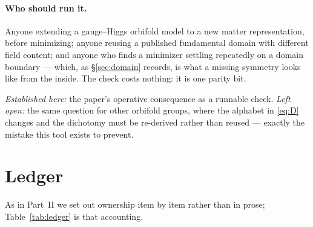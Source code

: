 \documentclass[11pt,a4paper]{article}
\begin{document}
\paragraph{Who should run it.} Anyone extending a gauge--Higgs orbifold model to a new
matter representation, before minimizing; anyone reusing a published fundamental domain with
different field content; and anyone who finds a minimizer settling repeatedly on a domain
boundary --- which, as \S\ref{sec:domain} records, is what a missing symmetry looks like from
the inside. The check costs nothing: it is one parity bit.

\emph{Established here:} the paper's operative consequence as a runnable check.
\emph{Left open:} the same question for other orbifold groups, where the alphabet in
\eqref{eq:D} changes and the dichotomy must be re-derived rather than reused --- exactly the
mistake this tool exists to prevent.

\section{Ledger}\label{sec:ledger}
As in Part~II we set out ownership item by item rather than in prose;
Table~\ref{tab:ledger} is that accounting.
\end{document}
